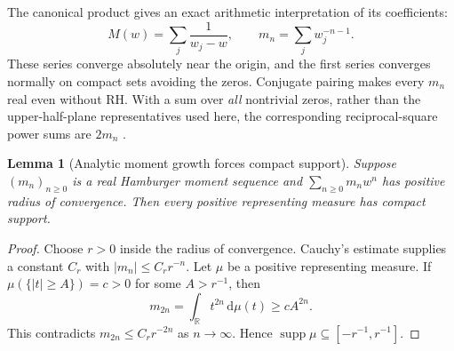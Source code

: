 \documentclass[11pt,letterpaper]{article}
\numberwithin{equation}{section}
\newtheorem{lemma}[theorem]{Lemma}
\theoremstyle{definition}
\theoremstyle{remark}
\newcommand{\R}{\mathbb R}
\newcommand{\dd}{\,\mathrm d}
\DeclareMathOperator{\supp}{supp}
\begin{document}
The canonical product gives an exact arithmetic interpretation of its coefficients:
\begin{equation}
 M(w)=\sum_j\frac{1}{w_j-w},\qquad
 m_n=\sum_jw_j^{-n-1}.
 \label{eq:powersums}
\end{equation}
These series converge absolutely near the origin, and the first series converges normally on compact sets avoiding the zeros. Conjugate pairing makes every $m_n$ real even without RH. With a sum over \emph{all} nontrivial zeros, rather than the upper-half-plane representatives used here, the corresponding reciprocal-square power sums are $2m_n$ \cite{voros}.

\begin{lemma}[Analytic moment growth forces compact support]
\label{lem:compactmoment}
Suppose $(m_n)_{n\geq0}$ is a real Hamburger moment sequence and $\sum_{n\geq0}m_nw^n$ has positive radius of convergence. Then every positive representing measure has compact support.
\end{lemma}
\begin{proof}
Choose $r>0$ inside the radius of convergence. Cauchy's estimate supplies a constant $C_r$ with $|m_n|\leq C_rr^{-n}$. Let $\mu$ be a positive representing measure. If $\mu(\{|t|\geq A\})=c>0$ for some $A>r^{-1}$, then
\[
 m_{2n}=\int_\R t^{2n}\dd\mu(t)\geq cA^{2n}.
\]
This contradicts $m_{2n}\leq C_rr^{-2n}$ as $n\to\infty$. Hence $\supp\mu\subseteq[-r^{-1},r^{-1}]$.
\end{proof}
\end{document}
